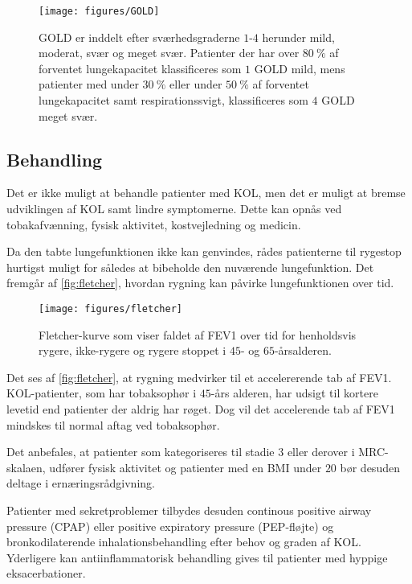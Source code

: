 \begin{figure} [H]
\centering
\texttt{[image: figures/GOLD]}
\caption{GOLD er inddelt efter sværhedsgraderne $1$-$4$ herunder mild, moderat, svær og meget svær. Patienter der har over $80~\%$ af forventet lungekapacitet klassificeres som $1$ GOLD mild, mens patienter med under $30~\%$ eller under $50~\%$ af forventet lungekapacitet samt respirationssvigt, klassificeres som $4$ GOLD meget svær.}
\label{fig:GOLD}
\end{figure} 

\subsection{Behandling} \label{Behandling}
Det er ikke muligt at behandle patienter med KOL, men det er muligt at bremse udviklingen af KOL samt lindre symptomerne. Dette kan opnås ved tobakafvænning, fysisk aktivitet, kostvejledning og medicin. 

Da den tabte lungefunktionen ikke kan genvindes, rådes patienterne til rygestop hurtigst muligt for således at bibeholde den nuværende lungefunktion. Det fremgår af \autoref{fig:fletcher}, hvordan rygning kan påvirke lungefunktionen over tid. 

\begin{figure} [H]
\centering
\texttt{[image: figures/fletcher]}
\caption{Fletcher-kurve som viser faldet af FEV1 over tid for henholdsvis rygere, ikke-rygere og rygere stoppet i $45$- og $65$-årsalderen.\cite{dsam2016}}
\label{fig:fletcher}
\end{figure} 

\noindent
Det ses af \autoref{fig:fletcher}, at rygning medvirker til et accelererende tab af FEV1. KOL-patienter, som har tobaksophør i $45$-års alderen, har udsigt til kortere levetid end patienter der aldrig har røget. Dog vil det accelerende tab af FEV1 mindskes til normal aftag ved tobaksophør.\cite{dsam2016}

Det anbefales, at patienter som kategoriseres til stadie $3$ eller derover i MRC-skalaen, udfører fysisk aktivitet og patienter med en BMI under $ 20$ bør desuden deltage i ernæringsrådgivning. 

Patienter med sekretproblemer tilbydes desuden continous positive airway pressure (CPAP) eller positive expiratory pressure (PEP-fløjte) og bronkodilaterende inhalationsbehandling efter behov og graden af KOL. Yderligere kan antiinflammatorisk behandling gives til patienter med hyppige eksacerbationer. \cite{Basisbogen2016}
 
